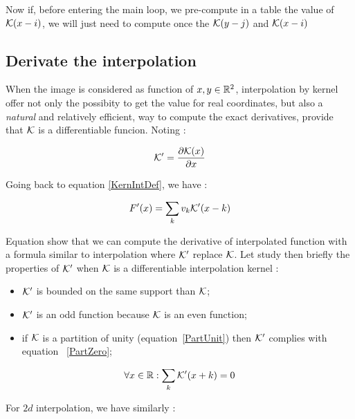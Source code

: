 Now if, before entering the main loop, we pre-compute in a table the value of $\mathcal K(x-i)$,  
we will just need to  compute once the $\mathcal K(y-j)$ and $\mathcal K(x-i)$


\subsection{Derivate the interpolation}

\label{InterpDeriv}

When the image is considered as function of $x,y \in \mathbb{R}^2$, interpolation by kernel
offer not only the possibity to get the value for real coordinates, but also a \emph{natural}
and relatively efficient, way to compute the exact derivatives, provide that $\mathcal K$ is
a differentiable funcion. Noting :

\begin{equation}
       \mathcal K' =  \frac{\partial \mathcal K(x)}{\partial x}  \label{DefDerKern}
\end{equation}

Going back to equation \ref{KernIntDef}, we have :


\begin{equation}
    F'(x)  = \sum_{k}  v_k  \mathcal K'(x-k)   \label{KernIntDeriv1D}
\end{equation}

Equation show that we can compute the derivative of interpolated function
with a formula similar to  interpolation where $\mathcal K'$ replace $\mathcal K$.
Let study then briefly the properties of $\mathcal K'$ when 
 $\mathcal K$ is a differentiable interpolation kernel :

\begin{itemize}
   \item  $\mathcal K'$ is bounded on the same support than $\mathcal K$;
   \item  $\mathcal K'$ is an odd function because $\mathcal K$ is an even function;
   \item  if $\mathcal K$ is a partition of unity (equation~\ref{PartUnit}) then $\mathcal K'$ complies with equation  ~\ref{PartZero};
\end{itemize}

\begin{equation}
    \forall x \in \mathbb{R} : \sum_k \mathcal K'(x+k) =   0 \label{PartZero}
\end{equation}

For $2d$ interpolation, we have similarly :

